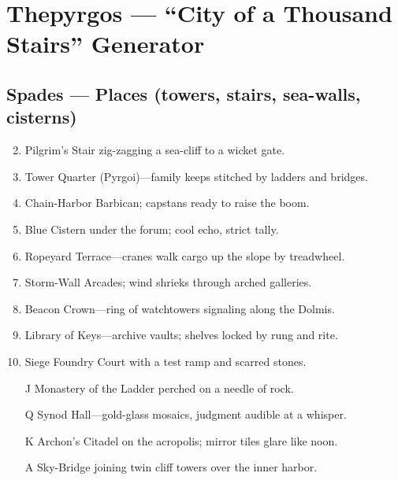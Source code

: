 \chapter{Thepyrgos --- ``City of a Thousand Stairs'' Generator}
\label{chap:thepyrgos}

\section*{Spades --- Places (towers, stairs, sea-walls, cisterns)}
\label{sec:thepyrgos-places}
\begin{enumerate}
\setcounter{enumi}{1}
\item Pilgrim's Stair zig-zagging a sea-cliff to a wicket gate.
\item Tower Quarter (Pyrgoi)---family keeps stitched by ladders and bridges.
\item Chain-Harbor Barbican; capstans ready to raise the boom.
\item Blue Cistern under the forum; cool echo, strict tally.
\item Ropeyard Terrace---cranes walk cargo up the slope by treadwheel.
\item Storm-Wall Arcades; wind shrieks through arched galleries.
\item Beacon Crown---ring of watchtowers signaling along the Dolmis.
\item Library of Keys---archive vaults; shelves locked by rung and rite.
\item Siege Foundry Court with a test ramp and scarred stones.
\item[J] Monastery of the Ladder perched on a needle of rock.
\item[Q] Synod Hall---gold-glass mosaics, judgment audible at a whisper.
\item[K] Archon's Citadel on the acropolis; mirror tiles glare like noon.
\item[A] Sky-Bridge joining twin cliff towers over the inner harbor.
\end{enumerate}

